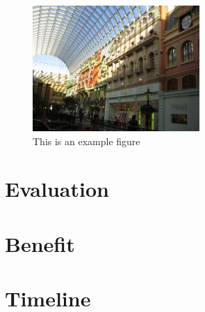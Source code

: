 \documentclass[10pt,a4paper]{article}
\begin{document}
    \begin{figure}[!hbt]
        \centering
        \includegraphics[width=0.7\linewidth]{gfx/example_1}
        \caption{This is an example figure}
        \label{fig:example1}
    \end{figure}    
    
    \section{Evaluation}
    \lipsum[1-1]
    
    \section{Benefit}
    \lipsum[1-1]
    
    
    
    \section{Timeline}
    
\end{document}
